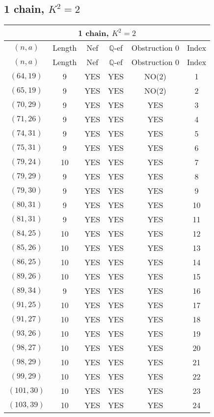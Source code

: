 \subsection{1 chain, $K^2 = 2$}
\begin{longtable}{|c|c|c|c|c|c|}
\hline
\multicolumn{6}{|c|}{1 chain, $K^2 = 2$}\\
\hline
$(n,a)$ & Length & Nef & $\mathbb Q$-ef & Obstruction 0 & Index\\
\hline
\endfirsthead

\hline
$(n,a)$ & Length & Nef & $\mathbb Q$-ef & Obstruction 0 & Index\\
\hline
\endhead
\hline
\endfoot

$(64, 19)$ & 9 & YES & YES & NO(2) & 1\\
$(65, 19)$ & 9 & YES & YES & NO(2) & 2\\
$(70, 29)$ & 9 & YES & YES & YES & 3\\
$(71, 26)$ & 9 & YES & YES & YES & 4\\
$(74, 31)$ & 9 & YES & YES & YES & 5\\
$(75, 31)$ & 9 & YES & YES & YES & 6\\
$(79, 24)$ & 10 & YES & YES & YES & 7\\
$(79, 29)$ & 9 & YES & YES & YES & 8\\
$(79, 30)$ & 9 & YES & YES & YES & 9\\
$(80, 31)$ & 9 & YES & YES & YES & 10\\
$(81, 31)$ & 9 & YES & YES & YES & 11\\
$(84, 25)$ & 10 & YES & YES & YES & 12\\
$(85, 26)$ & 10 & YES & YES & YES & 13\\
$(86, 25)$ & 10 & YES & YES & YES & 14\\
$(89, 26)$ & 10 & YES & YES & YES & 15\\
$(89, 34)$ & 9 & YES & YES & YES & 16\\
$(91, 25)$ & 10 & YES & YES & YES & 17\\
$(91, 27)$ & 10 & YES & YES & YES & 18\\
$(93, 26)$ & 10 & YES & YES & YES & 19\\
$(98, 27)$ & 10 & YES & YES & YES & 20\\
$(98, 29)$ & 10 & YES & YES & YES & 21\\
$(99, 29)$ & 10 & YES & YES & YES & 22\\
$(101, 30)$ & 10 & YES & YES & YES & 23\\
$(103, 39)$ & 10 & YES & YES & YES & 24\\

\end{longtable}
